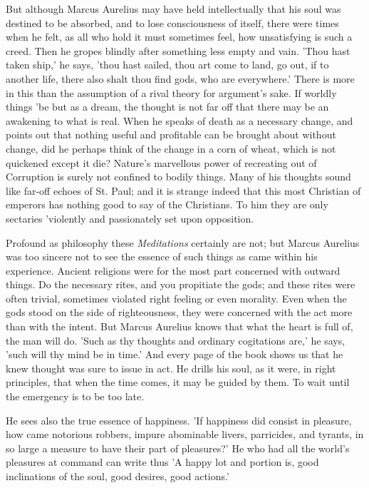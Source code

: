 But although Marcus Aurelius may have held intellectually that his soul was
destined to be absorbed, and to lose consciousness of itself, there were times
when he felt, as all who hold it must sometimes feel, how unsatisfying is such
a creed. Then he gropes blindly after something less empty and vain. 'Thou hast
taken ship,' he says, 'thou hast sailed, thou art come to land, go out, if to
another life, there also shalt thou find gods, who are everywhere.' There is
more in this than the assumption of a rival theory for argument's sake. If
worldly things 'be but as a dream, the thought is not far off that there may be
an awakening to what is real. When he speaks of death as a necessary change,
and points out that nothing useful and profitable can be brought about without
change, did he perhaps think of the change in a corn of wheat, which is not
quickened except it die? Nature's marvellous power of recreating out of
Corruption is surely not confined to bodily things. Many of his thoughts sound
like far-off echoes of St. Paul; and it is strange indeed that this most
Christian of emperors has nothing good to say of the Christians. To him they
are only sectaries 'violently and passionately set upon opposition.

Profound as philosophy these \emph{Meditations} certainly are not; but Marcus
Aurelius was too sincere not to see the essence of such things as came within
his experience. Ancient religions were for the most part concerned with outward
things. Do the necessary rites, and you propitiate the gods; and these rites
were often trivial, sometimes violated right feeling or even morality. Even
when the gods stood on the side of righteousness, they were concerned with the
act more than with the intent. But Marcus Aurelius knows that what the heart is
full of, the man will do. 'Such as thy thoughts and ordinary cogitations are,'
he says, 'such will thy mind be in time.' And every page of the book shows us
that he knew thought was sure to issue in act. He drills his soul, as it were,
in right principles, that when the time comes, it may be guided by them. To
wait until the emergency is to be too late.

He sees also the true essence of happiness. 'If happiness did consist in
pleasure, how came notorious robbers, impure abominable livers, parricides, and
tyrants, in so large a measure to have their part of pleasures?' He who had all
the world's pleasures at command can write thus 'A happy lot and portion is,
good inclinations of the soul, good desires, good actions.'

